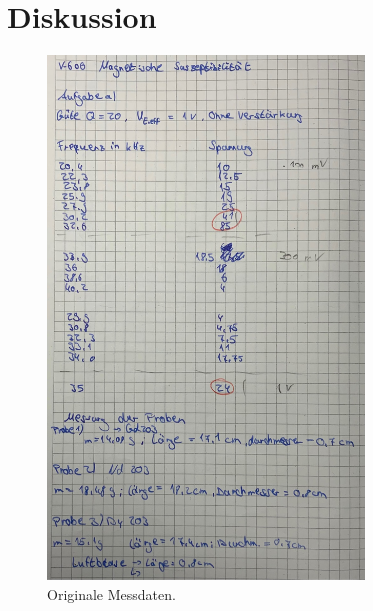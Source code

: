 \section{Diskussion}
\label{sec:Diskussion}

\begin{figure}[H]
    \centering
    \includegraphics[width=0.75\textwidth]{data/origDaten1.jpg}
    \caption{Originale Messdaten.}
    \label{fig:daten1}
\end{figure}

